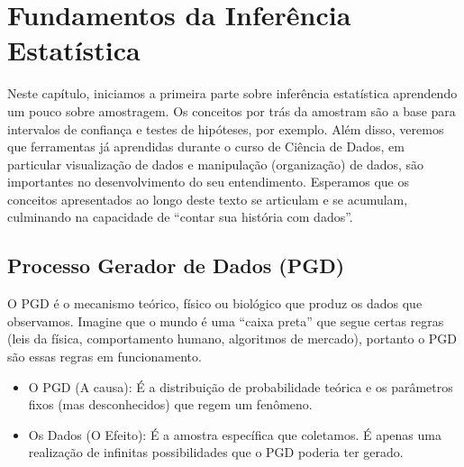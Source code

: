 \documentclass[
  letterpaper,
  DIV=11,
  numbers=noendperiod]{scrreprt}
\begin{document}

\chapter{Fundamentos da Inferência
Estatística}\label{fundamentos-da-inferuxeancia-estatuxedstica}

Neste capítulo, iniciamos a primeira parte sobre inferência estatística
aprendendo um pouco sobre amostragem. Os conceitos por trás da amostram
são a base para intervalos de confiança e testes de hipóteses, por
exemplo. Além disso, veremos que ferramentas já aprendidas durante o
curso de Ciência de Dados, em particular visualização de dados e
manipulação (organização) de dados, são importantes no desenvolvimento
do seu entendimento. Esperamos que os conceitos apresentados ao longo
deste texto se articulam e se acumulam, culminando na capacidade de
``contar sua história com dados''.

\section{Processo Gerador de Dados
(PGD)}\label{processo-gerador-de-dados-pgd}

O PGD é o mecanismo teórico, físico ou biológico que produz os dados que
observamos. Imagine que o mundo é uma ``caixa preta'' que segue certas
regras (leis da física, comportamento humano, algoritmos de mercado),
portanto o PGD são essas regras em funcionamento.

\begin{tcolorbox}[enhanced jigsaw, colback=white, leftrule=.75mm, colbacktitle=quarto-callout-note-color!10!white, breakable, titlerule=0mm, bottomtitle=1mm, title=\textcolor{quarto-callout-note-color}{\faInfo}\hspace{0.5em}{Realidade vs.~Observação}, colframe=quarto-callout-note-color-frame, toprule=.15mm, opacityback=0, bottomrule=.15mm, opacitybacktitle=0.6, arc=.35mm, toptitle=1mm, rightrule=.15mm, coltitle=black, left=2mm]

\begin{itemize}
\item
  O PGD (A causa): É a distribuição de probabilidade teórica e os
  parâmetros fixos (mas desconhecidos) que regem um fenômeno.
\item
  Os Dados (O Efeito): É a amostra específica que coletamos. É apenas
  uma realização de infinitas possibilidades que o PGD poderia ter
  gerado.
\end{itemize}

\end{tcolorbox}
\end{document}
